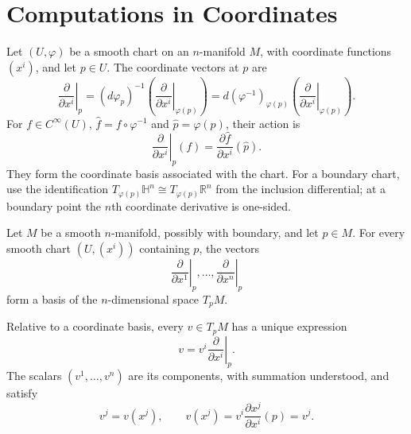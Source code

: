 \section{Computations in Coordinates}

\begin{definition}
\label{def:3-15-extra-1}





Let $(U,\varphi)$ be a smooth chart on an $n$-manifold $M$, with coordinate
functions $(x^i)$, and let $p\in U$. The coordinate vectors at $p$ are
\[
\left.\frac{\partial}{\partial x^i}\right|_p
=(d\varphi_p)^{-1}
 \left(\left.\frac{\partial}{\partial x^i}\right|_{\varphi(p)}\right)
=d(\varphi^{-1})_{\varphi(p)}
 \left(\left.\frac{\partial}{\partial x^i}\right|_{\varphi(p)}\right). \tag{3.8}
\]
For $f\in C^\infty(U)$, $\widehat f=f\circ\varphi^{-1}$ and
$\widehat p=\varphi(p)$, their action is
\[
\left.\frac{\partial}{\partial x^i}\right|_p(f)
=\frac{\partial\widehat f}{\partial x^i}(\widehat p).
\]
They form the coordinate basis associated with the chart. For a boundary
chart, use the identification
$T_{\varphi(p)}\mathbb{H}^n\cong T_{\varphi(p)}\mathbb{R}^n$ from the
inclusion differential; at a boundary point the $n$th coordinate derivative
is one-sided.
\end{definition}

\begin{proposition}
\label{prop:3-15}




Let $M$ be a smooth $n$-manifold, possibly with boundary, and let $p\in M$.
For every smooth chart $(U,(x^i))$ containing $p$, the vectors
\[
\left.\frac{\partial}{\partial x^1}\right|_p,\ldots,
\left.\frac{\partial}{\partial x^n}\right|_p
\]
form a basis of the $n$-dimensional space $T_pM$.
\end{proposition}

\begin{definition}
\label{def:3-15-extra-2}




Relative to a coordinate basis, every $v\in T_pM$ has a unique expression
\[
v=\left.v^i\frac{\partial}{\partial x^i}\right|_p.
\]
The scalars $(v^1,\ldots,v^n)$ are its components, with summation understood,
and satisfy
\[
v^j=v(x^j),
\qquad
v(x^j)=v^i\frac{\partial x^j}{\partial x^i}(p)=v^j.
\]
\end{definition}

